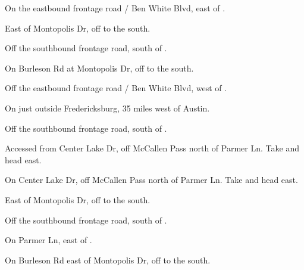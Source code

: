 

\begin{LocationList}

On the eastbound  frontage road / Ben White Blvd, east of .

East of Montopolis Dr, off  to the south.

\Location{\GarageHQ \Garage}
Off the southbound  frontage road, south of .

\Location{\GasStation \Gas \Rest}
On Burleson Rd at Montopolis Dr, off  to the south.

Off the eastbound  frontage road / Ben White Blvd, west of .

On  just outside Fredericksburg, 35 miles west of Austin.

Off the southbound  frontage road, south of .

Accessed from Center Lake Dr, off McCallen Pass north of  Parmer Ln. Take   and head east.

On Center Lake Dr, off McCallen Pass north of  Parmer Ln. Take   and head east.

East of Montopolis Dr, off  to the south.

Off the southbound  frontage road, south of .

On  Parmer Ln, east of  .

On Burleson Rd east of Montopolis Dr, off  to the south.

\end{LocationList}
